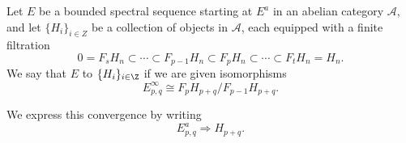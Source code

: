 \documentclass[main.tex]{subfiles}
\begin{document}
\begin{definition}
  \label{def:bounded_convergence}
  Let $E$ be a bounded spectral sequence starting at $E^{a}$ in an abelian category $\mathcal{A}$, and let $\{H_{i}\}_{i \in Z}$ be a collection of objects in $\mathcal{A}$, each equipped with a finite filtration
  \begin{equation*}
    0 = F_{s}H_{n} \subset \cdots \subset F_{p-1}H_{n} \subset F_{p}H_{n} \subset \cdots \subset F_{t}H_{n} = H_{n}.
  \end{equation*}
  We say that $E$  to $\{H_{i}\}_{i \in \Z}$ if we are given isomorphisms
  \begin{equation*}
    E^{\infty}_{p,q} \cong F_{p}H_{p+q}/F_{p-1}H_{p+q}.
  \end{equation*}

  We express this convergence by writing
  \begin{equation*}
    E^{a}_{p,q} \Rightarrow H_{p+q}.
  \end{equation*}
\end{definition}
\end{document}
